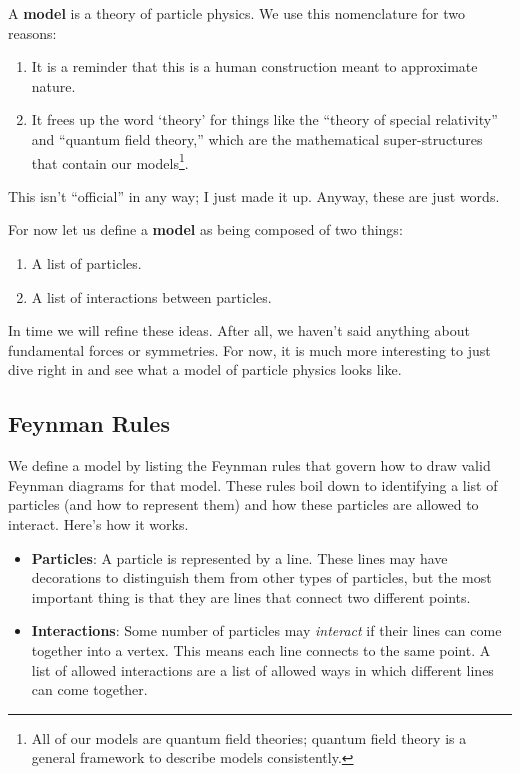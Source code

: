 \documentclass[12pt]{article}
\numberwithin{equation}{section}    %
\theoremstyle{definition}
\begin{document}
A \textbf{model} is a theory of particle physics. We use this nomenclature for two reasons:
\begin{enumerate}
	\item It is a reminder that this is a human construction meant to approximate nature.
	\item It frees up the word `theory' for things like the ``theory of special relativity'' and ``quantum field theory,'' which are the mathematical super-structures that contain our models\footnote{All of our models are quantum field theories; quantum field theory is a general framework to describe models consistently.}.
\end{enumerate}
This isn't ``official'' in any way; I just made it up. Anyway, these are just words. 

For now let us define a \textbf{model} as being composed of two things:
\begin{enumerate}
	\item A list of particles.
	\item A list of interactions between particles. 
\end{enumerate}
In time we will refine these ideas. After all, we haven't said anything about fundamental forces or symmetries. For now, it is much more interesting to just dive right in and see what a model of particle physics looks like.

\subsection{Feynman Rules}

We define a model by listing the Feynman rules that govern how to draw valid Feynman diagrams for that model. These rules boil down to identifying a list of particles (and how to represent them) and how these particles are allowed to interact. Here's how it works.

\begin{itemize}
	\item \textbf{Particles}: A particle is represented by a line. These lines may have decorations to distinguish them from other types of particles, but the most important thing is that they are lines that connect two different points.
	\item \textbf{Interactions}: Some number of particles may \emph{interact} if their lines can come together into a vertex. This means each line connects to the same point. A list of allowed interactions are a list of allowed ways in which different lines can come together.
\end{itemize}
\end{document}
